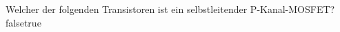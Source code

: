     {Welcher der folgenden Transistoren ist ein selbstleitender P-Kanal-MOSFET?}
    {}
    {}
    {}
    {}
    {false}{true}